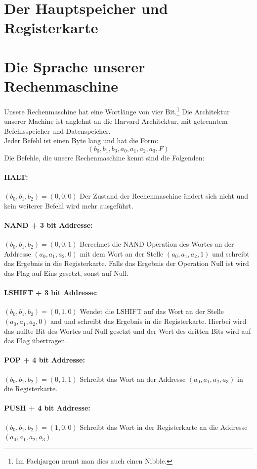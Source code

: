 \documentclass[11pt,a4paper,leqno]{report}
\numberwithin{equation}{chapter}
\begin{document}
\section{Der Hauptspeicher und Registerkarte}
\section{Die Sprache unserer Rechenmaschine}
Unsere Rechenmaschine hat eine Wortl\"ange von vier Bit.\footnote{Im Fachjargon nennt man dies auch einen Nibble.} Die Architektur unserer Machine ist anglehnt an die Harvard Architektur, mit getrenntem Befehlsspeicher und Datenspeicher.\\
Jeder Befehl ist einen Byte lang und hat die Form:
$$(b_0, b_1, b_3, a_0, a_1, a_2, a_3, F)$$
Die Befehle, die unsere Rechenmaschine kennt sind die Folgenden:
\paragraph{HALT:} $(b_0, b_1, b_2) = (0, 0, 0)$ Der Zustand der Rechenmaschine \"andert sich nicht und kein weiterer Befehl wird mehr ausgef\"uhrt.
\paragraph{NAND + 3 bit Addresse:} $(b_0, b_1, b_2) = (0, 0, 1)$ Berechnet die NAND Operation des Wortes an der Addresse $(a_0, a_1, a_2, 0)$ mit dem Wort an der Stelle $(a_0, a_1, a_2, 1)$ und schreibt das Ergebnis in die Registerkarte. Falls das Ergebnis der Operation Null ist wird das Flag auf Eins gesetzt, sonst auf Null.
\paragraph{LSHIFT + 3 bit Addresse:} $(b_0, b_1, b_2) = (0, 1, 0)$ Wendet die LSHIFT auf das Wort an der Stelle $(a_0, a_1, a_2, 0)$ and und schreibt das Ergebnis in die Registerkarte. Hierbei wird das nullte Bit des Wortes auf Null gesetzt und der Wert des dritten Bits wird auf das Flag \"ubertragen.
\paragraph{POP + 4 bit Addresse:} $(b_0, b_1, b_2) = (0, 1, 1)$ Schreibt das Wort an der Addresse $(a_0, a_1, a_2, a_3)$ in die Registerkarte.
\paragraph{PUSH + 4 bit Addresse:} $(b_0, b_1, b_2) = (1, 0, 0)$ Schreibt das Wort in der Registerkarte an die Addresse $(a_0, a_1, a_2, a_3)$.
\end{document}
